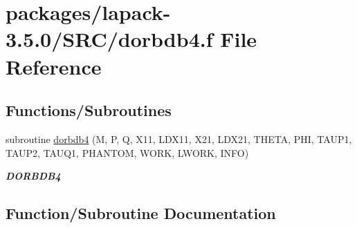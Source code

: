 \hypertarget{dorbdb4_8f}{}\section{packages/lapack-\/3.5.0/\+S\+R\+C/dorbdb4.f File Reference}
\label{dorbdb4_8f}
\subsection*{Functions/\+Subroutines}
\begin{DoxyCompactItemize}
\item 
subroutine \hyperlink{dorbdb4_8f_aa0e7502d397f098169595d832bddd54c}{dorbdb4} (M, P, Q, X11, L\+D\+X11, X21, L\+D\+X21, T\+H\+E\+T\+A, P\+H\+I, T\+A\+U\+P1, T\+A\+U\+P2, T\+A\+U\+Q1, P\+H\+A\+N\+T\+O\+M, W\+O\+R\+K, L\+W\+O\+R\+K, I\+N\+F\+O)
\begin{DoxyCompactList}\small\item\em {\bfseries D\+O\+R\+B\+D\+B4} \end{DoxyCompactList}\end{DoxyCompactItemize}


\subsection{Function/\+Subroutine Documentation}
\hypertarget{dorbdb4_8f_aa0e7502d397f098169595d832bddd54c}{}
